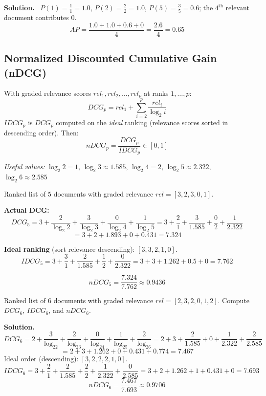 \documentclass[11pt, a4paper]{article}
\newcommand{\Solution}{\medskip\noindent\textbf{\color{exgreen}Solution.}\ }
\begin{document}
\Solution
$P(1)=\tfrac11=1.0$, $P(2)=\tfrac22=1.0$, $P(5)=\tfrac35=0.6$; the $4^{\text{th}}$ relevant document contributes $0$.
\[
AP = \frac{1.0+1.0+0.6+0}{4} = \frac{2.6}{4} = 0.65
\]

\subsection{Normalized Discounted Cumulative Gain (nDCG)}

\begin{formulabox}
With graded relevance scores $rel_1, rel_2, \dots, rel_p$ at ranks $1,\dots,p$:
\[
DCG_p = rel_1 + \sum_{i=2}^{p} \frac{rel_i}{\log_2 i}
\]
$IDCG_p$ is $DCG_p$ computed on the \emph{ideal} ranking (relevance scores sorted in descending order). Then:
\[
nDCG_p = \frac{DCG_p}{IDCG_p} \in [0,1]
\]
\end{formulabox}

\begin{center}
\small \textit{Useful values:} $\log_2 2=1$, $\log_2 3\approx1.585$, $\log_2 4=2$, $\log_2 5\approx2.322$, $\log_2 6\approx2.585$
\end{center}

\begin{examplebox}
Ranked list of $5$ documents with graded relevance $rel = [3,2,3,0,1]$.

\textbf{Actual DCG:}
\[
DCG_5 = 3 + \frac{2}{\log_2 2} + \frac{3}{\log_2 3} + \frac{0}{\log_2 4} + \frac{1}{\log_2 5}
= 3 + \frac{2}{1} + \frac{3}{1.585} + \frac{0}{2} + \frac{1}{2.322}
\]
\[
= 3 + 2 + 1.893 + 0 + 0.431 = 7.324
\]

\textbf{Ideal ranking} (sort relevance descending): $[3,3,2,1,0]$.
\[
IDCG_5 = 3 + \frac{3}{1} + \frac{2}{1.585} + \frac{1}{2} + \frac{0}{2.322} = 3+3+1.262+0.5+0 = 7.762
\]

\[
nDCG_5 = \frac{7.324}{7.762} \approx 0.9436
\]
\end{examplebox}

\begin{exercisebox}
Ranked list of $6$ documents with graded relevance $rel = [2,3,2,0,1,2]$. Compute $DCG_6$, $IDCG_6$, and $nDCG_6$.
\end{exercisebox}

\Solution
\[
DCG_6 = 2 + \frac{3}{\log_22} + \frac{2}{\log_23} + \frac{0}{\log_24} + \frac{1}{\log_25} + \frac{2}{\log_26}
= 2+3+\frac{2}{1.585}+0+\frac{1}{2.322}+\frac{2}{2.585}
\]
\[
= 2+3+1.262+0+0.431+0.774 = 7.467
\]
Ideal order (descending): $[3,2,2,2,1,0]$.
\[
IDCG_6 = 3+\frac{2}{1}+\frac{2}{1.585}+\frac{2}{2}+\frac{1}{2.322}+\frac{0}{2.585} = 3+2+1.262+1+0.431+0 = 7.693
\]
\[
nDCG_6 = \frac{7.467}{7.693} \approx 0.9706
\]
\end{document}
